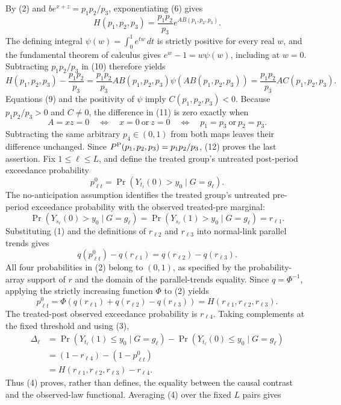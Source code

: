 By (2) and \(be^{x+z}=p_1p_2/p_3\), exponentiating (6) gives
\[
H(p_1,p_2,p_3)
=\frac{p_1p_2}{p_3}e^{AB(p_1,p_2,p_3)}.
\tag{10}
\]
The defining integral \(\psi(w)=\int_0^1e^{tw}\,dt\) is strictly positive for every real \(w\), and the fundamental theorem of calculus gives \(e^w-1=w\psi(w)\), including at \(w=0\).  Subtracting \(p_1p_2/p_3\) in (10) therefore yields
\[
H(p_1,p_2,p_3)-\frac{p_1p_2}{p_3}
=\frac{p_1p_2}{p_3}A B(p_1,p_2,p_3)
\psi\!\left(A B(p_1,p_2,p_3)\right)
=\frac{p_1p_2}{p_3}A C(p_1,p_2,p_3).
\tag{11}
\]
Equations (9) and the positivity of \(\psi\) imply \(C(p_1,p_2,p_3)<0\).  Because \(p_1p_2/p_3>0\) and \(C\ne0\), the difference in (11) is zero exactly when
\[
A=xz=0
\quad\Longleftrightarrow\quad
x=0\ \text{or}\ z=0
\quad\Longleftrightarrow\quad
p_1=p_3\ \text{or}\ p_2=p_3.
\tag{12}
\]
Subtracting the same arbitrary \(p_4\in(0,1)\) from both maps leaves their difference unchanged.  Since \(P^{\rm P}(p_1,p_2,p_3)=p_1p_2/p_3\), (12) proves the last assertion.
Fix \(1\le\ell\le L\), and define the treated group's untreated post-period exceedance probability
\[
p^0_{\ell t}=\Pr\!\left(Y_{t_\ell}(0)>y_0\mid G=g_\ell\right).
\]
The no-anticipation assumption identifies the treated group's untreated pre-period exceedance probability with the observed treated-pre marginal:
\[
\Pr\!\left(Y_{s_\ell}(0)>y_0\mid G=g_\ell\right)
=\Pr\!\left(Y_{s_\ell}(1)>y_0\mid G=g_\ell\right)
=r_{\ell1}.
\tag{1}
\]
Substituting (1) and the definitions of \(r_{\ell2}\) and \(r_{\ell3}\) into normal-link parallel trends gives
\[
q(p^0_{\ell t})-q(r_{\ell1})
=q(r_{\ell2})-q(r_{\ell3}).
\tag{2}
\]
All four probabilities in (2) belong to \((0,1)\), as specified by the probability-array support of \(r\) and the domain of the parallel-trends equality.  Since \(q=\Phi^{-1}\), applying the strictly increasing function \(\Phi\) to (2) yields
\[
p^0_{\ell t}
=\Phi\!\left(q(r_{\ell1})+q(r_{\ell2})-q(r_{\ell3})\right)
=H(r_{\ell1},r_{\ell2},r_{\ell3}).
\tag{3}
\]
The treated-post observed exceedance probability is \(r_{\ell4}\).  Taking complements at the fixed threshold and using (3),
\[
\begin{aligned}
\Delta_\ell
&=\Pr\!\left(Y_{t_\ell}(1)\le y_0\mid G=g_\ell\right)
-\Pr\!\left(Y_{t_\ell}(0)\le y_0\mid G=g_\ell\right)\\
&=(1-r_{\ell4})-(1-p^0_{\ell t})\\
&=H(r_{\ell1},r_{\ell2},r_{\ell3})-r_{\ell4}.
\end{aligned}
\tag{4}
\]
Thus (4) proves, rather than defines, the equality between the causal contrast and the observed-law functional.  Averaging (4) over the fixed \(L\) pairs gives
